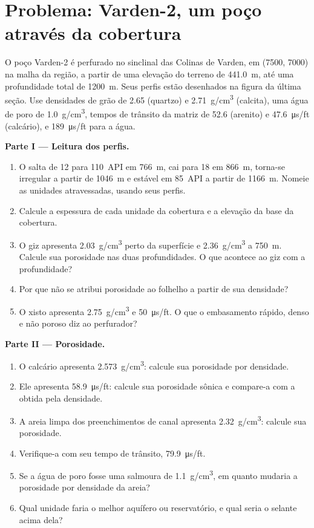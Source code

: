 \section{Problema: Varden-2, um poço através da cobertura}

\begin{problem}
\label{pb:b3:facies-models:1}
O poço Varden-2 é perfurado no sinclinal das Colinas de Varden, em
(7500, 7000) na malha da região, a partir de uma elevação do terreno de
\qty{441.0}{m}, até uma profundidade total de \qty{1200}{m}. Seus perfis estão desenhados na
figura da última seção. Use densidades de grão de 2.65 (quartzo) e
\qty{2.71}{g/cm^3} (calcita), uma água de poro de \qty{1.0}{g/cm^3}, tempos de trânsito da matriz
de 52.6 (arenito) e \qty{47.6}{\micro\second/ft}
(calcário), e \qty{189}{\micro\second/ft} para a água.

\medskip\noindent\textbf{Parte I --- Leitura dos perfis.}
\begin{enumerate}
\item O  salta de 12 para \qty{110}{API} em \qty{766}{m}, cai
  para 18 em \qty{866}{m}, torna-se irregular a partir de \qty{1046}{m} e estável em
  \qty{85}{API} a partir de \qty{1166}{m}. Nomeie as unidades atravessadas, usando seus perfis.
\item Calcule a espessura de cada unidade da cobertura e a elevação da
  base da cobertura.
\item O giz apresenta \qty{2.03}{g/cm^3} perto da superfície e
  \qty{2.36}{g/cm^3} a \qty{750}{m}. Calcule sua porosidade nas duas profundidades.
  O que acontece ao giz com a profundidade?
\item Por que não se atribui porosidade ao folhelho a partir de sua densidade?
\item O xisto apresenta \qty{2.75}{g/cm^3} e \qty{50}{\micro\second/ft}.
  O que o embasamento rápido, denso e não poroso diz ao perfurador?
\end{enumerate}

\medskip\noindent\textbf{Parte II --- Porosidade.}
\begin{enumerate}[resume]
\item O calcário apresenta \qty{2.573}{g/cm^3}: calcule sua porosidade por densidade.
\item Ele apresenta \qty{58.9}{\micro\second/ft}: calcule sua porosidade sônica e
  compare-a com a obtida pela densidade.
\item A areia limpa dos preenchimentos de canal apresenta \qty{2.32}{g/cm^3}: calcule
  sua porosidade.
\item Verifique-a com seu tempo de trânsito, \qty{79.9}{\micro\second/ft}.
\item Se a água de poro fosse uma salmoura de \qty{1.1}{g/cm^3}, em quanto mudaria
  a porosidade por densidade da areia?
\item Qual unidade faria o melhor aquífero ou reservatório, e qual seria o
  selante acima dela?
\end{enumerate}


\end{problem}
